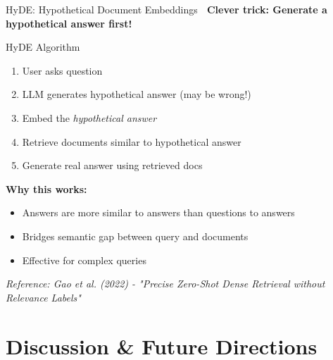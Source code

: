 \documentclass[aspectratio=169]{beamer}
\begin{document}
\begin{frame}[shrink=10]{HyDE: Hypothetical Document Embeddings 💭}
\textbf{Clever trick: Generate a hypothetical answer first!}

\vspace{0.5em}

\begin{block}{HyDE Algorithm}
\begin{enumerate}\setlength{\itemsep}{0pt}
    \item User asks question
    \item LLM generates hypothetical answer (may be wrong!)
    \item Embed the \textit{hypothetical answer}
    \item Retrieve documents similar to hypothetical answer
    \item Generate real answer using retrieved docs
\end{enumerate}
\end{block}

\vspace{0.5em}

\textbf{Why this works:}
\begin{itemize}\setlength{\itemsep}{0pt}
    \item Answers are more similar to answers than questions to answers
    \item Bridges semantic gap between query and documents
    \item Effective for complex queries
\end{itemize}

\vspace{0.5em}

\small
\textit{Reference: Gao et al. (2022) - "Precise Zero-Shot Dense Retrieval without Relevance Labels"}
\end{frame}

\section{Discussion \& Future Directions}
\end{document}
